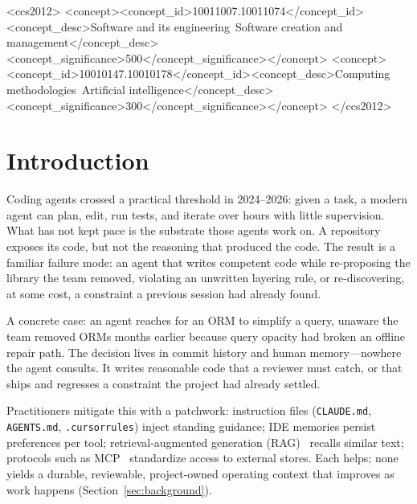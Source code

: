 \documentclass[sigconf,screen]{acmart}
\begin{document}
\begin{CCSXML}
<ccs2012>
<concept><concept_id>10011007.10011074</concept_id><concept_desc>Software and its engineering~Software creation and management</concept_desc><concept_significance>500</concept_significance></concept>
<concept><concept_id>10010147.10010178</concept_id><concept_desc>Computing methodologies~Artificial intelligence</concept_desc><concept_significance>300</concept_significance></concept>
</ccs2012>
\end{CCSXML}

\maketitle

\section{Introduction}
Coding agents crossed a practical threshold in 2024--2026: given a task, a modern
agent can plan, edit, run tests, and iterate over hours with little supervision.
What has not kept pace is the substrate those agents work on. A repository exposes
its code, but not the reasoning that produced the code. The result is a familiar
failure mode: an agent that writes competent code while re-proposing the library
the team removed, violating an unwritten layering rule, or re-discovering, at some
cost, a constraint a previous session had already found.

A concrete case: an agent reaches for an ORM to simplify a query, unaware the team
removed ORMs months earlier because query opacity had broken an offline repair
path. The decision lives in commit history and human memory---nowhere the agent
consults. It writes reasonable code that a reviewer must catch, or that ships and
regresses a constraint the project had already settled.

Practitioners mitigate this with a patchwork: instruction files
(\texttt{CLAUDE.md}, \texttt{AGENTS.md}, \texttt{.cursorrules}) inject standing
guidance; IDE memories persist preferences per tool; retrieval-augmented
generation (RAG)~\cite{lewis2020rag} recalls similar text; protocols such as
MCP~\cite{mcp2024} standardize access to external stores. Each helps; none yields
a durable, reviewable, project-owned operating context that improves as work
happens (Section~\ref{sec:background}).
\end{document}
